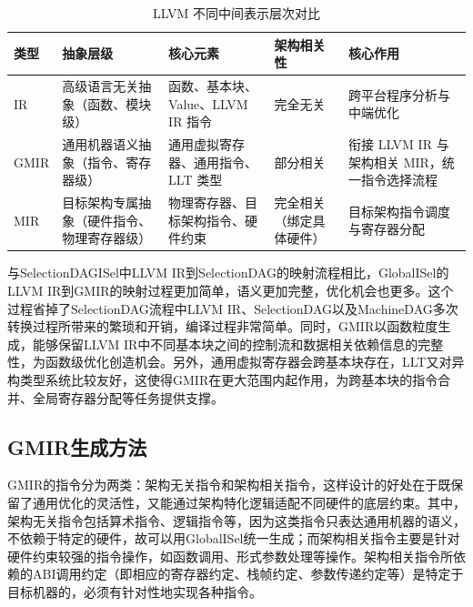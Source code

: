 \begin{table}[htbp]
	\centering
	\caption{LLVM 不同中间表示层次对比}
	\label{tab:ir_gmir_mir}
	
	\renewcommand{\arraystretch}{1.2}
	{\footnotesize
		\begin{tabularx}{\linewidth}{
				>{\raggedright\arraybackslash}m{1.2cm}
				>{\centering\arraybackslash}X
				>{\centering\arraybackslash}X
				>{\centering\arraybackslash}X
				>{\centering\arraybackslash}X
			}
			\toprule
			类型 & 抽象层级 & 核心元素 & 架构相关性 & 核心作用 \\
			\midrule
			IR &
			高级语言无关抽象（函数、模块级） &
			函数、基本块、Value、LLVM IR 指令 &
			完全无关 &
			跨平台程序分析与中端优化 \\
			
			GMIR &
			通用机器语义抽象（指令、寄存器级） &
			通用虚拟寄存器、通用指令、LLT 类型 &
			部分相关 &
			衔接 LLVM IR 与架构相关 MIR，统一指令选择流程 \\
			
			MIR &
			目标架构专属抽象（硬件指令、物理寄存器级） &
			物理寄存器、目标架构指令、硬件约束 &
			完全相关（绑定具体硬件） &
			目标架构指令调度与寄存器分配 \\
			\bottomrule
		\end{tabularx}
	}
\end{table}

与SelectionDAGISel中LLVM IR到SelectionDAG的映射流程相比，GlobalISel的LLVM IR到GMIR的映射过程更加简单，语义更加完整，优化机会也更多。这个过程省掉了SelectionDAG流程中LLVM IR、SelectionDAG以及MachineDAG多次转换过程所带来的繁琐和开销，编译过程非常简单。同时，GMIR以函数粒度生成，能够保留LLVM IR中不同基本块之间的控制流和数据相关依赖信息的完整性，为函数级优化创造机会。另外，通用虚拟寄存器会跨基本块存在，LLT又对异构类型系统比较友好，这使得GMIR在更大范围内起作用，为跨基本块的指令合并、全局寄存器分配等任务提供支撑。


\subsection{GMIR生成方法}
GMIR的指令分为两类：架构无关指令和架构相关指令，这样设计的好处在于既保留了通用优化的灵活性，又能通过架构特化逻辑适配不同硬件的底层约束。其中，架构无关指令包括算术指令、逻辑指令等，因为这类指令只表达通用机器的语义，不依赖于特定的硬件，故可以用GlobalISel统一生成；而架构相关指令主要是针对硬件约束较强的指令操作，如函数调用、形式参数处理等操作。架构相关指令所依赖的ABI调用约定（即相应的寄存器约定、栈帧约定、参数传递约定等）是特定于目标机器的，必须有针对性地实现各种指令。

